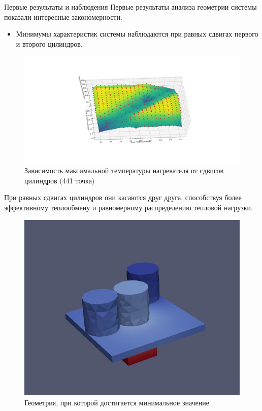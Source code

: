 \documentclass{beamer}
\begin{document}
\begin{frame}{Первые результаты и наблюдения}
	Первые результаты анализа геометрии системы показали интересные закономерности.

	\vspace{1em}
	\begin{itemize}
		\item Минимумы характеристик системы наблюдаются при равных сдвигах первого и второго цилиндров.
	\end{itemize}

	\begin{figure}[h]
		\centering
		\includegraphics[width=0.4\linewidth]{18.3.jpg}
		\caption{Зависимость максимальной температуры нагревателя от сдвигов цилиндров (441 точка)}
	\end{figure}

	При равных сдвигах цилиндров они касаются друг друга, способствуя более эффективному теплообмену и равномерному распределению тепловой нагрузки.

	\begin{figure}[h]
		\centering
		\includegraphics[width=0.4\linewidth]{19.jpg}
		\caption{Геометрия, при которой достигается минимальное значение}
	\end{figure}
\end{frame}
\end{document}
